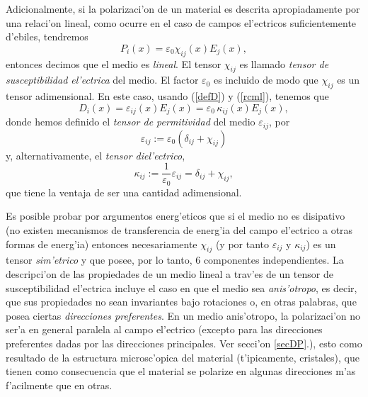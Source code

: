 Adicionalmente, si la polarizaci'on de un material es descrita apropiadamente
por una relaci'on lineal, como ocurre en el caso de campos el'ectricos
suficientemente d'ebiles, tendremos
\begin{equation}
\boxed{P_i(x)=\varepsilon_0\chi_{ij}(x)E_j(x),} \label{rcml}
\end{equation}
entonces decimos que el medio es \textit{lineal}. El tensor $\chi_{ij}$ es
llamado \textit{tensor de susceptibilidad el'ectrica} del medio.  El factor $\varepsilon_0$ es incluido de modo que $\chi_{ij}$ es un tensor adimensional. En este caso,
usando (\ref{defD}) y (\ref{rcml}), tenemos que
\begin{equation}\label{rclai}
\boxed{D_i(x)=\varepsilon_{ij}(x)E_j(x)=\varepsilon_0\,\kappa_{ij}(x)E_j(x),}
\end{equation}
donde hemos definido el \textit{tensor de permitividad} del medio
$\varepsilon_{ij}$, por
\begin{equation}
\varepsilon_{ij}:=\varepsilon_0(\delta_{ij}+\chi_{ij})
\end{equation}
y, alternativamente,  el \textit{tensor diel'ectrico},
\begin{equation}
\kappa_{ij}:=\frac{1}{\varepsilon_0}\varepsilon_{ij}=\delta_{ij}+\chi_{ij},
\end{equation}
que tiene la ventaja de ser una cantidad adimensional.

Es posible probar por
argumentos energ'eticos que si el medio no es disipativo (no existen mecanismos
de transferencia de energ'ia del campo el'ectrico a otras formas de energ'ia)
entonces necesariamente $\chi_{ij}$ (y por tanto $\varepsilon_{ij}$ y
$\kappa_{ij}$) es un tensor \textit{sim'etrico} y que posee, por lo
tanto, 6 componentes independientes. La descripci'on de las
propiedades de un medio lineal a trav'es de un tensor de susceptibilidad
el'ectrica incluye el caso en que el medio sea \textit{anis'otropo}, es decir,
que sus propiedades no sean invariantes bajo rotaciones o, en otras palabras,
que posea ciertas \textit{direcciones preferentes}. En un medio anis'otropo, la
polarizaci'on no ser'a en general paralela al campo el'ectrico (excepto para las
direcciones preferentes dadas por las direcciones principales. Ver secci'on
\ref{secDP}.), esto como
resultado de la estructura microsc'opica del material (t'ipicamente, cristales),
que tienen como consecuencia que el material se polarize en algunas direcciones
m'as f'acilmente que en otras.


